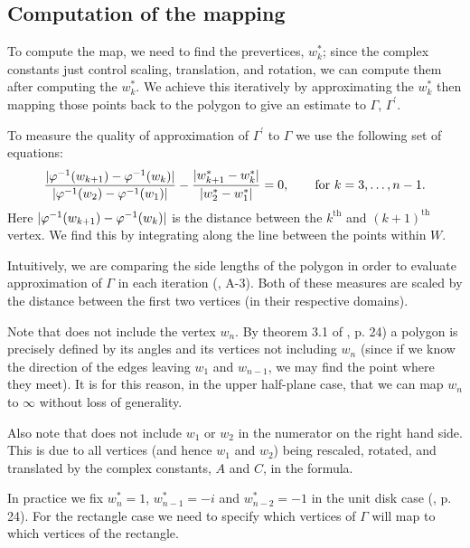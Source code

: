 \subsection{Computation of the \sch mapping}

To compute the map, we need to find the prevertices, $w^*_k$; since the complex constants just control scaling, translation, and rotation, we can compute them after computing the $w^*_k$. We achieve this iteratively by approximating the $w^*_k$ then mapping those points back to the polygon to give an estimate to $\Gamma$, $\Gamma^\prime$. 

To measure the quality of approximation of $\Gamma^\prime$ to $\Gamma$ we use the following set of equations:
\begin{equation}
\label{optimizeme}
\frac{\vert \varphi^{-1}(w_{k+1}) -  \varphi^{-1}(w_k) \vert}{\vert \varphi^{-1}(w_2)-\varphi^{-1}(w_1)\vert} - \frac{\vert w^*_{k+1} - w^*_k\vert}{\vert w^*_2 - w^*_1\vert} = 0, \qquad \text{for } k=3,\dots,n-1.
\end{equation}
Here $\vert \varphi^{-1}(w_{k+1}) -  \varphi^{-1}(w_k) \vert$ is the distance between the $k^{\text{th}}$ and $(k+1)^{\text{th}}$ vertex.  We find this by integrating along the line between the points within $W$.

Intuitively, we are comparing the side lengths of the polygon in order to evaluate approximation of $\Gamma$ in each iteration (\cite{snider}, A-3). Both of these measures are scaled by the distance between the first two vertices (in their respective domains).

Note that  does not include the vertex $w_n$. By theorem 3.1 of \cite{driscoll}, p. 24) a polygon is precisely defined by its angles and its vertices not including $w_n$ (since if we know the direction of the edges leaving $w_1$ and $w_{n-1}$, we may find the point where they meet). It is for this reason, in the upper half-plane case, that we can map $w_n$ to $\infty$ without loss of generality.

Also note that  does not include $w_1$ or $w_2$ in the numerator on the right hand side. This is due to all vertices (and hence $w_1$ and $w_2$) being rescaled, rotated, and translated by the complex constants, $A$ and $C$, in the \sch formula.

In practice we fix $w^*_n=1$, $w^*_{n-1}=-i$ and $w^*_{n-2}=-1$ in the unit disk case (\cite{driscoll}, p. 24). For the rectangle case we need to specify which vertices of $\Gamma$ will map to which vertices of the rectangle.

